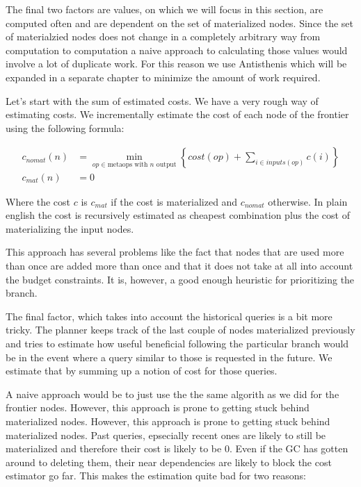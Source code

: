The final two factors are values, on which we will focus in this
section, are computed often and are dependent on the set of
materialized nodes. Since the set of materialzied nodes does not
change in a completely arbitrary way from computation to computation a
naive approach to calculating those values would involve a lot of
duplicate work. For this reason we use Antisthenis which will be
expanded in a separate chapter to minimize the amount of work
required.

Let's start with the sum of estimated costs. We have a very rough way
of estimating costs. We incrementally estimate the cost of each node
of the frontier using the following formula:

\begin{align}
  c_{nomat}(n) &=
    \min\limits_{op \in \text{metaops with \(n\) output}} \left\{ cost(op) + \sum\limits_{i \in inputs(op)} c(i)  \right\} \\
  c_{mat}(n) &= 0
\end{align}

Where the cost \(c\) is \(c_{mat}\) if the cost is materialized and
\(c_{nomat}\) otherwise. In plain english the cost is recursively
estimated as cheapest combination  plus the cost of
materializing the input nodes.

This approach has several problems like the fact that nodes that are
used more than once are added more than once and that it does not take
at all into account the budget constraints. It is, however, a good
enough heuristic for prioritizing the branch.

The final factor, which takes into account the historical queries is a
bit more tricky. The planner keeps track of the last couple of nodes
materialized previously and tries to estimate how useful beneficial
following the particular branch would be in the event where a query
similar to those is requested in the future. We estimate that by
summing up a notion of cost for those queries.

A naive approach would be to just use the the same algorith as we did
for the frontier nodes. However, this approach is prone to getting
stuck behind materialized nodes. However, this approach is
prone to getting stuck behind materialized nodes. Past queries,
epsecially recent ones are likely to still be materialized and
therefore their cost is likely to be 0. Even if the GC has gotten
around to deleting them, their near dependencies are likely to block
the cost estimator go far. This makes the estimation quite bad for two
reasons:

